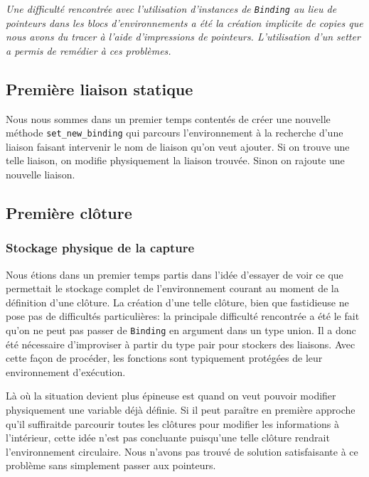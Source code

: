 \documentclass[a4paper,11pt]{article}
\newcommand{\dbend}{{\manual\char127}}
\newenvironment{attention}%
{\description\item[\dbend]\sl}%
{\enddescription}
\begin{document}
\begin{attention}
  Une difficulté rencontrée avec l'utilisation d'instances de \texttt{Binding}
  au lieu de pointeurs dans les blocs d'environnements a été la création
  implicite de copies que nous avons du tracer à l'aide d'impressions de
  pointeurs. L'utilisation d'un setter a permis de remédier à ces problèmes.
\end{attention}

\subsection{Première liaison statique}

Nous nous sommes dans un premier temps contentés de créer une nouvelle méthode
\texttt{set\_new\_binding} qui parcours l'environnement à la
recherche d'une liaison faisant intervenir le nom de liaison qu'on veut ajouter.
Si on trouve une telle liaison, on modifie physiquement la liaison trouvée.
Sinon on rajoute une nouvelle liaison.

\subsection{Première clôture}

\subsubsection{Stockage physique de la capture}

Nous étions dans un
premier temps partis dans l'idée d'essayer de voir ce que permettait le stockage complet de
l'environnement courant au moment de la définition d'une clôture. La création
d'une telle clôture, bien que fastidieuse ne pose pas de difficultés
particulières: la principale difficulté rencontrée a été le fait qu'on ne peut
pas passer de \texttt{Binding} en argument dans un type union. Il a donc été
nécessaire d'improviser à partir du type pair pour stockers des liaisons. Avec
cette façon de procéder, les fonctions sont typiquement protégées de leur
environnement d'exécution.

Là où la situation devient plus épineuse est quand on veut pouvoir modifier
physiquement une variable déjà définie. Si il peut paraître en première approche
qu'il \og suffirait\fg de parcourir toutes les clôtures pour modifier les
informations à l'intérieur, cette idée n'est pas concluante  puisqu'une telle clôture
rendrait l'environnement circulaire. Nous n'avons pas trouvé de solution
satisfaisante à ce problème sans simplement passer aux pointeurs.
\end{document}
